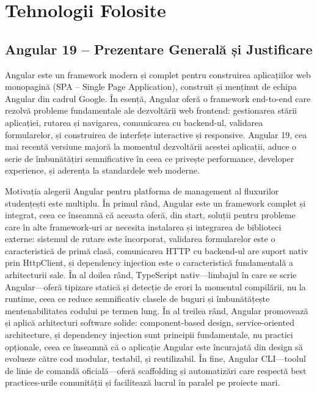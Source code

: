 \chapter{Tehnologii Folosite}
\label{cap:tehnologii}

\section{Angular 19 – Prezentare Generală și Justificare}

Angular este un framework modern și complet pentru construirea aplicațiilor web monopagină (SPA – Single Page Application), construit și menținut de echipa Angular din cadrul Google. În esență, Angular oferă o framework end-to-end care rezolvă probleme fundamentale ale dezvoltării web frontend: gestionarea stării aplicației, rutarea și navigarea, comunicarea cu backend-ul, validarea formularelor, și construirea de interfețe interactive și responsive. Angular 19, cea mai recentă versiune majoră la momentul dezvoltării acestei aplicații, aduce o serie de îmbunătățiri semnificative în ceea ce privește performance, developer experience, și aderența la standardele web moderne.

Motivația alegerii Angular pentru platforma de management al fluxurilor studențești este multiplu. În primul rând, Angular este un framework complet și integrat, ceea ce înseamnă că aceasta oferă, din start, soluții pentru probleme care în alte framework-uri ar necesita instalarea și integrarea de biblioteci externe: sistemul de rutare este încorporat, validarea formularelor este o caracteristică de primă clasă, comunicarea HTTP cu backend-ul are suport nativ prin HttpClient, și dependency injection este o caracteristică fundamentală a arhitecturii sale. În al doilea rând, TypeScript nativ—limbajul în care se scrie Angular—oferă tipizare statică și detecție de erori la momentul compilării, nu la runtime, ceea ce reduce semnificativ clasele de buguri și îmbunătățește mentenabilitatea codului pe termen lung. În al treilea rând, Angular promovează și aplică arhitecturi software solide: component-based design, service-oriented architecture, și dependency injection sunt principii fundamentale, nu practici opționale, ceea ce înseamnă că o aplicație Angular este încurajată din design să evolueze către cod modular, testabil, și reutilizabil. În fine, Angular CLI—toolul de linie de comandă oficială—oferă scaffolding și automatizări care respectă best practices-urile comunității și facilitează lucrul în paralel pe proiecte mari.

